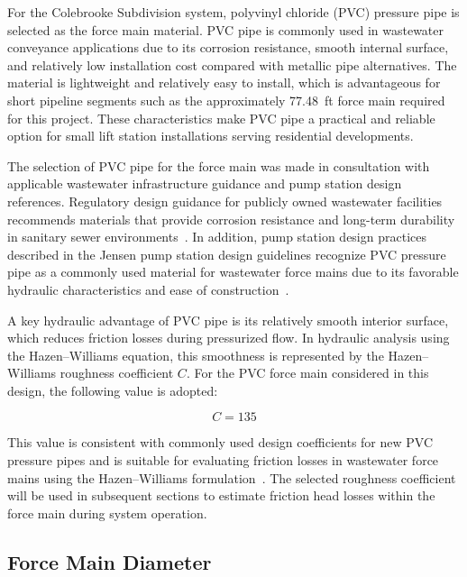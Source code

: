 For the Colebrooke Subdivision system, polyvinyl chloride (PVC) pressure pipe is selected as the force main material. PVC pipe is commonly used in wastewater conveyance applications due to its corrosion resistance, smooth internal surface, and relatively low installation cost compared with metallic pipe alternatives. The material is lightweight and relatively easy to install, which is advantageous for short pipeline segments such as the approximately 77.48~ft force main required for this project. These characteristics make PVC pipe a practical and reliable option for small lift station installations serving residential developments.

The selection of PVC pipe for the force main was made in consultation with applicable wastewater infrastructure guidance and pump station design references. Regulatory design guidance for publicly owned wastewater facilities recommends materials that provide corrosion resistance and long-term durability in sanitary sewer environments~\cite{MDEQ_DesignGuidance_2025}. In addition, pump station design practices described in the Jensen pump station design guidelines recognize PVC pressure pipe as a commonly used material for wastewater force mains due to its favorable hydraulic characteristics and ease of construction~\cite{Jensen_PumpStationDesignGuidelines_2012}.

A key hydraulic advantage of PVC pipe is its relatively smooth interior surface, which reduces friction losses during pressurized flow. In hydraulic analysis using the Hazen--Williams equation, this smoothness is represented by the Hazen--Williams roughness coefficient \(C\). For the PVC force main considered in this design, the following value is adopted:

\[
C = 135
\]

This value is consistent with commonly used design coefficients for new PVC pressure pipes and is suitable for evaluating friction losses in wastewater force mains using the Hazen--Williams formulation~\cite{Jensen_PumpStationDesignGuidelines_2012}. The selected roughness coefficient will be used in subsequent sections to estimate friction head losses within the force main during system operation.


\subsection{Force Main Diameter}

